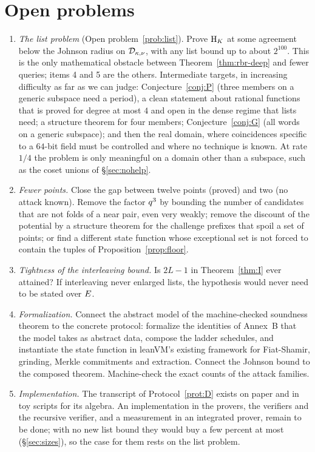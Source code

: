 \section{Open problems}\label{sec:open}

\begin{enumerate}[itemsep=3pt,topsep=3pt]
\item \emph{The list problem} (Open problem~\ref{prob:list}). Prove $\mathrm{H}_{K}$ at some agreement below the Johnson radius on $\mathcal{D}_{\kappa,\nu}$, with any list bound up to about $2^{100}$. This is the only mathematical obstacle between Theorem~\ref{thm:rbr-deep} and fewer queries; items 4 and 5 are the others. Intermediate targets, in increasing difficulty as far as we can judge: Conjecture~\ref{conj:P} (three members on a generic subspace need a period), a clean statement about rational functions that is proved for degree at most $4$ and open in the dense regime that lists need; a structure theorem for four members; Conjecture~\ref{conj:G} (all words on a generic subspace); and then the real domain, where coincidences specific to a $64$-bit field must be controlled and where no technique is known. At rate $1/4$ the problem is only meaningful on a domain other than a subspace, such as the coset unions of \S\ref{sec:nohelp}.
\item \emph{Fewer points.} Close the gap between twelve points (proved) and two (no attack known). Remove the factor $q^3$ by bounding the number of candidates that are not folds of a near pair, even very weakly; remove the discount of the potential by a structure theorem for the challenge prefixes that spoil a set of points; or find a different state function whose exceptional set is not forced to contain the tuples of Proposition~\ref{prop:floor}.
\item \emph{Tightness of the interleaving bound.} Is $2L-1$ in Theorem~\ref{thm:I} ever attained? If interleaving never enlarged lists, the hypothesis would never need to be stated over $E$.
\item \emph{Formalization.} Connect the abstract model of the machine-checked soundness theorem to the concrete protocol: formalize the identities of Annex~B that the model takes as abstract data, compose the ladder schedules, and instantiate the state function in leanVM's existing framework for Fiat-Shamir, grinding, Merkle commitments and extraction. Connect the Johnson bound to the composed theorem. Machine-check the exact counts of the attack families.
\item \emph{Implementation.} The transcript of Protocol~\ref{prot:D} exists on paper and in toy scripts for its algebra. An implementation in the provers, the verifiers and the recursive verifier, and a measurement in an integrated prover, remain to be done; with no new list bound they would buy a few percent at most (\S\ref{sec:sizes}), so the case for them rests on the list problem.
\end{enumerate}

